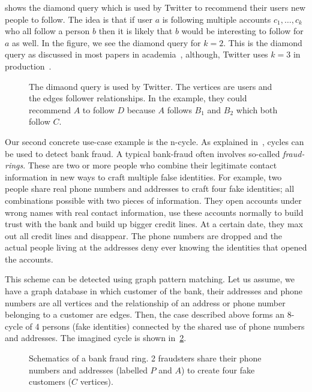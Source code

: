  shows the diamond query which is used by Twitter to recommend their users new people to follow.
The idea is that if user $a$ is following multiple accounts $c_1, \dots, c_k$ who all follow a person $b$ then it is likely that
$b$ would be interesting to follow for $a$ as well.
In the figure, we see the diamond query for $k = 2$.
This is the diamond query as discussed in most papers in academia~\cite{olddog,myria-detailed,mhedhbi2019}, although,
Twitter uses $k = 3$ in production~\cite{twitter-diamond}.

\begin{figure}
    \centering
    
    \caption{The dimaond query is used by Twitter. The vertices are users and the edges follower relationships.
    In the example, they could recommend $A$ to follow $D$ because $A$ follows $B_1$ and $B_2$ which both follow $C$.
    }
    \label{fig:pattern-diamond}
\end{figure}

Our second concrete use-case example is the n-cycle.
As explained in~\cite{fraud-detection}, cycles can be used to detect bank fraud.
A typical bank-fraud often involves so-called \textit{fraud-rings}.
These are two or more people who combine their legitimate contact information in new ways to craft multiple false identities.
For example, two people share real phone numbers and addresses to craft four fake identities; all combinations possible with two pieces
of information.
They open accounts under wrong names with real contact information, use these accounts normally to build trust with the bank and
build up bigger credit lines.
At a certain date, they max out all credit lines and disappear.
The phone numbers are dropped and the actual people living at the addresses deny ever knowing the identities that opened the accounts.

This scheme can be detected using graph pattern matching.
Let us assume, we have a graph database in which customer of the bank, their addresses and phone numbers are all vertices and the
relationship of an address or phone number belonging to a customer are edges.
Then, the case described above forms an 8-cycle of 4 persons (fake identities) connected by the shared use of phone numbers and
addresses.
The imagined cycle is shown in~\cref{fig:graph-pattern-example-bank-fraud}.

\begin{figure}
    \centering
    
    \caption{Schematics of a bank fraud ring.
    2 fraudsters share their phone numbers and addresses (labelled $P$ and $A$) to create four
    fake customers ($C$ vertices).
    }
    \label{fig:graph-pattern-example-bank-fraud}
\end{figure}


